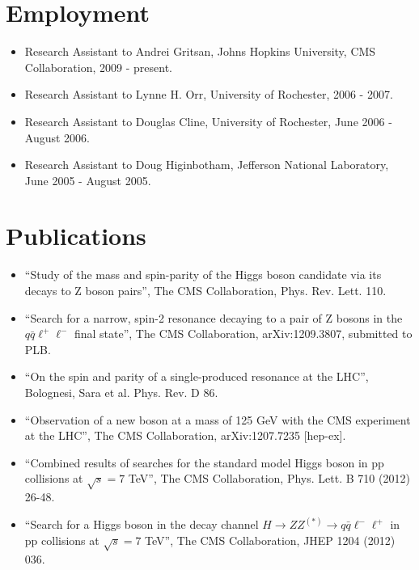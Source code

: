 \documentclass[12pt,oneside,final]{thesis}
\begin{document}
\begin{vita}
\section*{Employment}

\begin{itemize}
\item Research Assistant to Andrei Gritsan, Johns Hopkins University, CMS Collaboration, 2009 - present.
\item Research Assistant to Lynne H. Orr, University of Rochester, 2006 - 2007.
\item Research Assistant to Douglas Cline, University of Rochester, June 2006 - August 2006.
\item Research Assistant to Doug Higinbotham, Jefferson National Laboratory, June 2005 - August 2005.
\end{itemize}

\section*{Publications}


\begin{itemize}

\item ``Study of the mass and spin-parity of the Higgs boson candidate via its decays to Z boson pairs'', The CMS Collaboration, Phys. Rev. Lett. 110. 

\item ``Search for a narrow, spin-2 resonance decaying to a pair of Z bosons in the $q\bar{q}\ell^+\ell^-$ final state'', The CMS Collaboration, arXiv:1209.3807, submitted to PLB.

\item ``On the spin and parity of a single-produced resonance at the LHC'', Bolognesi, Sara et al. Phys. Rev. D 86.

\item ``Observation of a new boson at a mass of 125 GeV with the CMS experiment at the LHC'', The CMS Collaboration, arXiv:1207.7235 [hep-ex].

\item ``Combined results of searches for the standard model Higgs boson in pp collisions at $\sqrt{s} = 7$ TeV'', The CMS Collaboration, Phys. Lett. B 710 (2012) 26-48.

\item ``Search for a Higgs boson in the decay channel $H \to ZZ^{(*)} \to q \bar{q} \ell^-\ell^+$ in pp collisions at $\sqrt{s} = 7$ TeV'', The CMS Collaboration, JHEP 1204 (2012) 036.


\end{itemize}
\end{vita}
\end{document}
